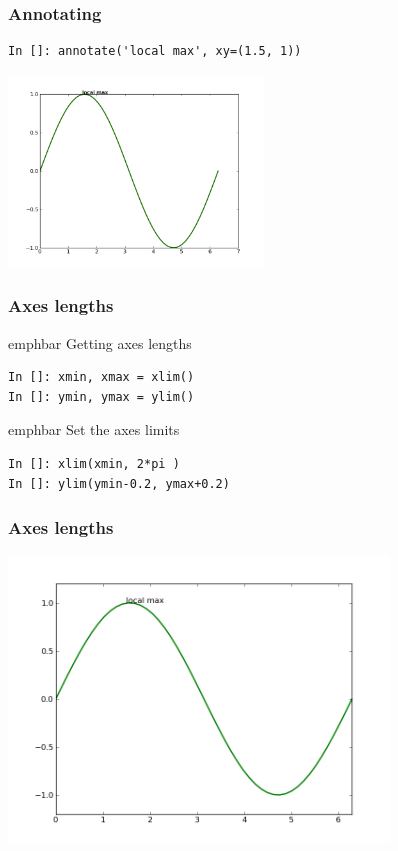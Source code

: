 \documentclass[14pt,compress]{beamer}
\newcommand{\emphbar}[1]
{\begin{beamercolorbox}[rounded=true]{emphbar} 
      {#1}
 \end{beamercolorbox}
}
\begin{document}
\begin{frame}[fragile]
\frametitle{Annotating}
\vspace*{-0.15in}
\begin{lstlisting}
In []: annotate('local max', xy=(1.5, 1))
\end{lstlisting}
\vspace*{-0.2in}
\begin{center}
  \includegraphics[height=2in, interpolate=true]{data/annotate}  
\end{center}
\end{frame}

\begin{frame}[fragile]
\frametitle{Axes lengths}
\emphbar{Getting axes lengths}
  \begin{lstlisting}
In []: xmin, xmax = xlim() 
In []: ymin, ymax = ylim() 
  \end{lstlisting}
\emphbar{Set the axes limits}
  \begin{lstlisting}
In []: xlim(xmin, 2*pi )
In []: ylim(ymin-0.2, ymax+0.2)
  \end{lstlisting}
\end{frame}

\begin{frame}[fragile]
  \frametitle{Axes lengths}
  \begin{center}
    \includegraphics[height=3in, interpolate=true]{data/limits}
  \end{center}
\end{frame}
\end{document}
